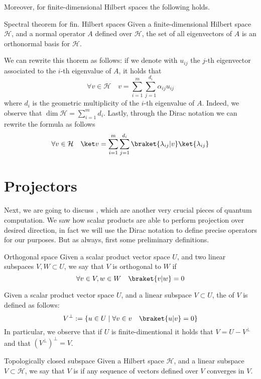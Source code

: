 \documentclass[a4paper, 12pt]{report}
\begin{document}
Moreover, for finite-dimensional Hilbert spaces the following holds.

\begin{framedthm}{Spectral theorem for fin. Hilbert spaces}
    Given a finite-dimensional Hilbert space $\mathcal H$, and a normal operator $A$ defined over $\mathcal H$, the set of all eigenvectors of $A$ is an orthonormal basis for $\mathcal H$.
\end{framedthm}

We can rewrite this thorem as follows: if we denote with $u_{ij}$ the $j$-th eigenvector associated to the $i$-th eigenvalue of $A$, it holds that $$\forall v \in \mathcal H \quad v = \sum_{i = 1}^m{\sum_{j = 1}^{d_i}{\alpha_{ij} u_{ij}}}$$ where $d_i$ is the geometric multiplicity of the $i$-th eigenvalue of $A$. Indeed, we observe that $\dim \mathcal H = \sum_{i = 1}^m{d_i}$. Lastly, through the Dirac notation we can rewrite the formula as follows $$\forall v \in \mathcal H \quad \ket v = \sum_{i = 1}^m{\sum_{j = 1}^{d_i}{\braket{\lambda_{ij}|v} \ket{\lambda_{ij}}}}$$

\section{Projectors}

Next, we are going to discuss , which are another very crucial pieces of quantum computation. We saw how scalar products are able to perform projection over desired direction, in fact we will use the Dirac notation to define precise operators for our purposes. But as always, first some preliminary definitions.

\begin{frameddefn}{Orthogonal space}
    Given a scalar product vector space $U$, and two linear subspaces $V, W \subset U$, we say that $V$ is orthogonal to $W$ if $$\forall v \in V, w \in W \quad \braket{v|w} = 0$$
\end{frameddefn}

Given a scalar product vector space $U$, and a linear subspace $V \subset U$, the  of $V$ is defined as follows: $$V^\bot := \{u \in U \mid \forall v \in v \quad \braket{u|v} = 0\}$$ In particular, we observe that if $U$ is finite-dimentional it holds that $V = U - V^\bot$ and that $(V^\bot)^\bot = V$.

\begin{frameddefn}{Topologically closed subspace}
    Given a Hilbert space $\mathcal H$, and a linear subspace $V \subset \mathcal H$, we say that $V$ is  if any sequence of vectors defined over $V$ converges in $V$.
\end{frameddefn}
\end{document}
